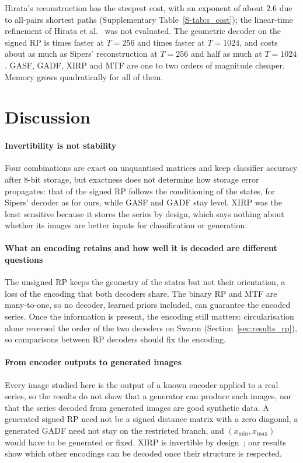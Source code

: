 \documentclass[preprint,review,12pt]{elsarticle}
\begin{document}
Hirata's reconstruction has the steepest cost, with an exponent of about $2.6$ due to all-pairs shortest paths (Supplementary Table~\ref{S-tab:s_cost}); the linear-time refinement of Hirata et al.~\cite{hirata2021fast} was not evaluated. The geometric decoder on the signed RP is \speedupMid{} times faster at $T=256$ and \speedupLong{} times faster at $T=1024$, and costs about as much as Sipers' reconstruction at $T=256$ and half as much at $T=1024$. GASF, GADF, XIRP and MTF are one to two orders of magnitude cheaper. Memory grows quadratically for all of them.
\FloatBarrier
\section{Discussion}\label{sec:discussion}

\paragraph{Invertibility is not stability}
Four combinations are exact on unquantised matrices and keep classifier accuracy after 8-bit storage, but exactness does not determine how storage error propagates: that of the signed RP follows the conditioning of the states, for Sipers' decoder as for ours, while GASF and GADF stay level. XIRP was the least sensitive because it stores the series by design, which says nothing about whether its images are better inputs for classification or generation.

\paragraph{What an encoding retains and how well it is decoded are different questions}
The unsigned RP keeps the geometry of the states but not their orientation, a loss of the encoding that both decoders share. The binary RP and MTF are many-to-one, so no decoder, learned priors included, can guarantee the encoded series. Once the information is present, the encoding still matters: circularisation alone reversed the order of the two decoders on Swarm (Section~\ref{sec:results_rp}), so comparisons between RP decoders should fix the encoding.

\paragraph{From encoder outputs to generated images}
Every image studied here is the output of a known encoder applied to a real series, so the results do not show that a generator can produce such images, nor that the series decoded from generated images are good synthetic data. A generated signed RP need not be a signed distance matrix with a zero diagonal, a generated GADF need not stay on the restricted branch, and $(x_{\min},x_{\max})$ would have to be generated or fixed. XIRP is invertible by design~\cite{hellermann2026imagegan}; our results show which other encodings can be decoded once their structure is respected.
\end{document}

